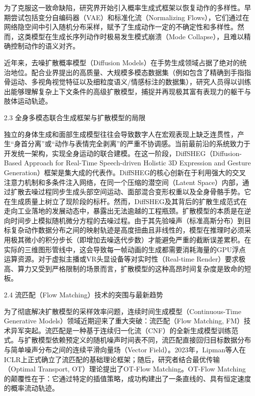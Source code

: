 \documentclass[UTF8]{ctexart}
\begin{document}
为了克服这一致命缺陷，研究界开始引入概率生成式框架以恢复动作的多样性。早期尝试包括变分自编码器（VAE）和标准化流（Normalizing
Flows），它们通过在网络隐空间中引入随机分布采样，赋予了生成动作一定的不确定性和多样性。然而，这类模型在生成长序列动作时极易发生模式崩溃（Mode
Collapse），且难以精确控制动作的语义对齐。

近年来，去噪扩散概率模型（Diffusion
Models）在手势生成领域占据了绝对的统治地位。配合业界提出的高质量、大规模多模态数据集（例如包含了精确到手指指骨运动、多视角视觉特征以及细粒度语义/情感标注的数据集），研究人员得以训练出能够理解复杂上下文条件的高级扩散模型，捕捉并再现极其富有表现力的躯干与肢体运动轨迹。

2.3 全身多模态联合生成框架与扩散模型的局限

独立的身体生成和面部生成模型往往会导致数字人在宏观表现上缺乏连贯性，产生``身首分离''或``动作与表情完全剥离''的严重不协调感。当前最前沿的系统致力于开发统一架构，实现全身运动的联合建模。在这一阶段，DiffSHEG（Diffusion-Based
Approach for Real-Time Speech-driven Holistic 3D Expression and Gesture
Generation）框架是集大成的代表作。DiffSHEG的核心创新在于利用强大的交叉注意力机制和多条件注入网络，在同一个压缩的潜空间（Latent
Space）内部，通过扩散去噪过程同步生成头部空间运动、面部混合变形权重以及全身骨骼手势。它在生成质量上树立了现阶段的标杆。然而，DiffSHEG及其背后的扩散生成范式在走向工业落地的发展动态中，暴露出无法逾越的工程瓶颈。扩散模型的本质是在逆向时间步上模拟随机微分方程的去噪过程。由于其先验噪声（标准高斯分布）到目标复杂动作数据分布之间的映射轨迹是高度扭曲且非线性的，模型在推理时必须采用极其微小的积分步长（即增加去噪迭代步数）才能避免严重的截断误差累积。在实际的三维图形管线中，这会导致每一帧动画的生成都需要消耗海量的GPU浮点运算资源。对于虚拟主播或VR头显设备等对实时性（Real-time
Render）要求极高、算力又受到严格限制的场景而言，扩散模型的这种高昂时间复杂度是致命的短板。

2.4 流匹配（Flow Matching）技术的突围与最新趋势

为了彻底解决扩散模型的采样效率问题，连续时间生成模型（Continuous-Time
Generative Models）领域近期迎来了重大突破：流匹配（Flow Matching,
FM）技术异军突起。流匹配是一种基于连续归一化流（CNF）的全新生成模型训练范式。与扩散模型依赖预定义的随机噪声时间表不同，流匹配直接回归目标数据分布与简单噪声分布之间的连续平滑向量场（Vector
Field）。2023年，Lipman等人在ICLR上正式确立了流匹配的基础理论框架；随后，研究者结合最优传输（Optimal
Transport, OT）理论提出了OT-Flow Matching。OT-Flow
Matching的颠覆性在于：它通过特定的插值策略，成功构建出了一条直线的、具有恒定速度的概率流动轨迹。
\end{document}
